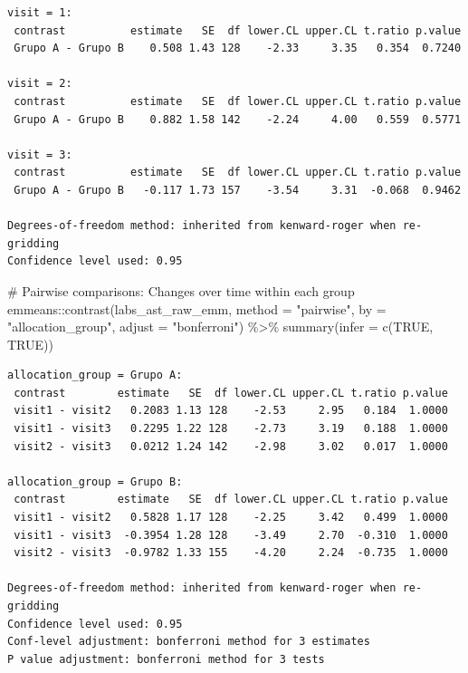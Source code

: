 \documentclass[
  letterpaper,
  DIV=11,
  numbers=noendperiod]{scrartcl}
\newenvironment{Shaded}{\begin{snugshade}}{\end{snugshade}}
\newcommand{\AttributeTok}[1]{\textcolor[rgb]{0.40,0.45,0.13}{#1}}
\newcommand{\CommentTok}[1]{\textcolor[rgb]{0.37,0.37,0.37}{#1}}
\newcommand{\ConstantTok}[1]{\textcolor[rgb]{0.56,0.35,0.01}{#1}}
\newcommand{\FunctionTok}[1]{\textcolor[rgb]{0.28,0.35,0.67}{#1}}
\newcommand{\NormalTok}[1]{\textcolor[rgb]{0.00,0.23,0.31}{#1}}
\newcommand{\SpecialCharTok}[1]{\textcolor[rgb]{0.37,0.37,0.37}{#1}}
\newcommand{\StringTok}[1]{\textcolor[rgb]{0.13,0.47,0.30}{#1}}
\begin{document}
\begin{verbatim}
visit = 1:
 contrast          estimate   SE  df lower.CL upper.CL t.ratio p.value
 Grupo A - Grupo B    0.508 1.43 128    -2.33     3.35   0.354  0.7240

visit = 2:
 contrast          estimate   SE  df lower.CL upper.CL t.ratio p.value
 Grupo A - Grupo B    0.882 1.58 142    -2.24     4.00   0.559  0.5771

visit = 3:
 contrast          estimate   SE  df lower.CL upper.CL t.ratio p.value
 Grupo A - Grupo B   -0.117 1.73 157    -3.54     3.31  -0.068  0.9462

Degrees-of-freedom method: inherited from kenward-roger when re-gridding 
Confidence level used: 0.95 
\end{verbatim}

\begin{Shaded}
\begin{Highlighting}[]
\CommentTok{\# Pairwise comparisons: Changes over time within each group}
\NormalTok{emmeans}\SpecialCharTok{::}\FunctionTok{contrast}\NormalTok{(labs\_ast\_raw\_emm, }\AttributeTok{method =} \StringTok{"pairwise"}\NormalTok{, }\AttributeTok{by =} \StringTok{"allocation\_group"}\NormalTok{, }\AttributeTok{adjust =} \StringTok{"bonferroni"}\NormalTok{) }\SpecialCharTok{\%\textgreater{}\%} \FunctionTok{summary}\NormalTok{(}\AttributeTok{infer =} \FunctionTok{c}\NormalTok{(}\ConstantTok{TRUE}\NormalTok{, }\ConstantTok{TRUE}\NormalTok{))}
\end{Highlighting}
\end{Shaded}

\begin{verbatim}
allocation_group = Grupo A:
 contrast        estimate   SE  df lower.CL upper.CL t.ratio p.value
 visit1 - visit2   0.2083 1.13 128    -2.53     2.95   0.184  1.0000
 visit1 - visit3   0.2295 1.22 128    -2.73     3.19   0.188  1.0000
 visit2 - visit3   0.0212 1.24 142    -2.98     3.02   0.017  1.0000

allocation_group = Grupo B:
 contrast        estimate   SE  df lower.CL upper.CL t.ratio p.value
 visit1 - visit2   0.5828 1.17 128    -2.25     3.42   0.499  1.0000
 visit1 - visit3  -0.3954 1.28 128    -3.49     2.70  -0.310  1.0000
 visit2 - visit3  -0.9782 1.33 155    -4.20     2.24  -0.735  1.0000

Degrees-of-freedom method: inherited from kenward-roger when re-gridding 
Confidence level used: 0.95 
Conf-level adjustment: bonferroni method for 3 estimates 
P value adjustment: bonferroni method for 3 tests 
\end{verbatim}
\end{document}
